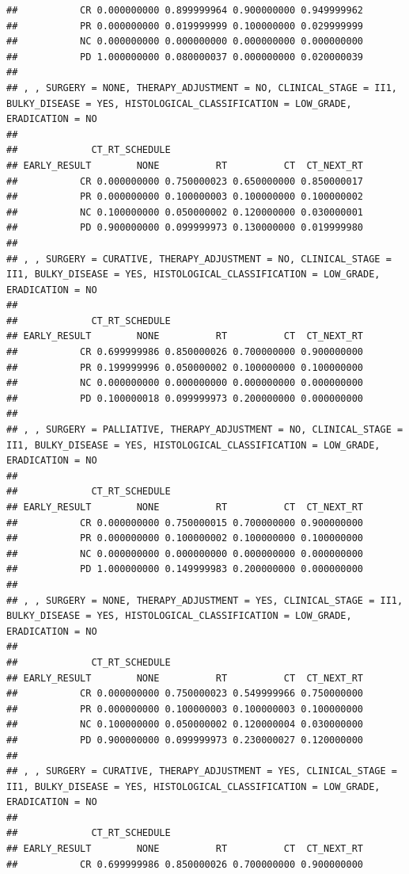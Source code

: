\documentclass[]{article}
\begin{document}
\begin{verbatim}
##           CR 0.000000000 0.899999964 0.900000000 0.949999962
##           PR 0.000000000 0.019999999 0.100000000 0.029999999
##           NC 0.000000000 0.000000000 0.000000000 0.000000000
##           PD 1.000000000 0.080000037 0.000000000 0.020000039
## 
## , , SURGERY = NONE, THERAPY_ADJUSTMENT = NO, CLINICAL_STAGE = II1, BULKY_DISEASE = YES, HISTOLOGICAL_CLASSIFICATION = LOW_GRADE, ERADICATION = NO
## 
##             CT_RT_SCHEDULE
## EARLY_RESULT        NONE          RT          CT  CT_NEXT_RT
##           CR 0.000000000 0.750000023 0.650000000 0.850000017
##           PR 0.000000000 0.100000003 0.100000000 0.100000002
##           NC 0.100000000 0.050000002 0.120000000 0.030000001
##           PD 0.900000000 0.099999973 0.130000000 0.019999980
## 
## , , SURGERY = CURATIVE, THERAPY_ADJUSTMENT = NO, CLINICAL_STAGE = II1, BULKY_DISEASE = YES, HISTOLOGICAL_CLASSIFICATION = LOW_GRADE, ERADICATION = NO
## 
##             CT_RT_SCHEDULE
## EARLY_RESULT        NONE          RT          CT  CT_NEXT_RT
##           CR 0.699999986 0.850000026 0.700000000 0.900000000
##           PR 0.199999996 0.050000002 0.100000000 0.100000000
##           NC 0.000000000 0.000000000 0.000000000 0.000000000
##           PD 0.100000018 0.099999973 0.200000000 0.000000000
## 
## , , SURGERY = PALLIATIVE, THERAPY_ADJUSTMENT = NO, CLINICAL_STAGE = II1, BULKY_DISEASE = YES, HISTOLOGICAL_CLASSIFICATION = LOW_GRADE, ERADICATION = NO
## 
##             CT_RT_SCHEDULE
## EARLY_RESULT        NONE          RT          CT  CT_NEXT_RT
##           CR 0.000000000 0.750000015 0.700000000 0.900000000
##           PR 0.000000000 0.100000002 0.100000000 0.100000000
##           NC 0.000000000 0.000000000 0.000000000 0.000000000
##           PD 1.000000000 0.149999983 0.200000000 0.000000000
## 
## , , SURGERY = NONE, THERAPY_ADJUSTMENT = YES, CLINICAL_STAGE = II1, BULKY_DISEASE = YES, HISTOLOGICAL_CLASSIFICATION = LOW_GRADE, ERADICATION = NO
## 
##             CT_RT_SCHEDULE
## EARLY_RESULT        NONE          RT          CT  CT_NEXT_RT
##           CR 0.000000000 0.750000023 0.549999966 0.750000000
##           PR 0.000000000 0.100000003 0.100000003 0.100000000
##           NC 0.100000000 0.050000002 0.120000004 0.030000000
##           PD 0.900000000 0.099999973 0.230000027 0.120000000
## 
## , , SURGERY = CURATIVE, THERAPY_ADJUSTMENT = YES, CLINICAL_STAGE = II1, BULKY_DISEASE = YES, HISTOLOGICAL_CLASSIFICATION = LOW_GRADE, ERADICATION = NO
## 
##             CT_RT_SCHEDULE
## EARLY_RESULT        NONE          RT          CT  CT_NEXT_RT
##           CR 0.699999986 0.850000026 0.700000000 0.900000000

\end{verbatim}
\end{document}
